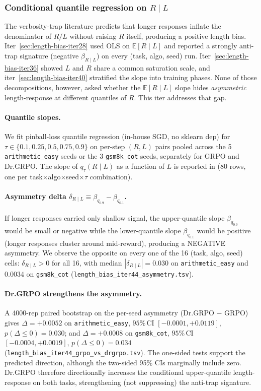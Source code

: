 \documentclass{article}
\newcommand{\E}{\mathbb{E}}
\newcommand{\task}{\textsf{task}}
\newcommand{\algo}{\textsf{algo}}
\newcommand{\seed}{\textsf{seed}}
\begin{document}
\subsubsection{Conditional quantile regression on $R \mid L$}\label{sec:lb-iter44}

The verbosity-trap literature predicts that longer responses inflate the
denominator of $R/L$ without raising $R$ itself, producing a positive length
bias. Iter~\ref{sec:length-bias-iter28} used OLS on $\E[R\mid L]$ and reported a
strongly anti-trap signature (negative $\beta_{R\mid L}$) on every
(\task, \algo, \seed) run. Iter~\ref{sec:length-bias-iter36} showed $L$ and $R$ share
a common saturation scale, and iter~\ref{sec:length-bias-iter40} stratified the slope
into training phases. None of those decompositions, however, asked whether the
$\E[R\mid L]$ slope hides \emph{asymmetric} length-response at different
quantiles of $R$. This iter addresses that gap.

\paragraph{Quantile slopes.}
We fit pinball-loss quantile regression (in-house SGD, no sklearn dep) for
$\tau \in \{0.1, 0.25, 0.5, 0.75, 0.9\}$ on per-step $(R, L)$ pairs pooled
across the 5 \texttt{arithmetic\_easy} seeds or the 3 \texttt{gsm8k\_cot}
seeds, separately for GRPO and Dr.GRPO. The slope of $q_\tau(R \mid L)$ as a
function of $L$ is reported in
 (80 rows,
one per \task$\times$\algo$\times$\seed$\times\tau$ combination).

\paragraph{Asymmetry delta $\delta_{R \mid L} \equiv \beta_{q_{0.9}} -
\beta_{q_{0.1}}$.}
If longer responses carried only shallow signal, the upper-quantile slope
$\beta_{q_{0.9}}$ would be small or negative while the lower-quantile slope
$\beta_{q_{0.1}}$ would be positive (longer responses cluster around
mid-reward), producing a NEGATIVE asymmetry. We observe the opposite on every
one of the 16 (\task, \algo, \seed) cells: $\delta_{R \mid L} > 0$ for all
16, with median $|\delta_{R \mid L}| = 0.030$ on \texttt{arithmetic\_easy}
and $0.0034$ on \texttt{gsm8k\_cot} (\texttt{length\_bias\_iter44\_asymmetry.tsv}).

\paragraph{Dr.GRPO strengthens the asymmetry.}
A 4000-rep paired bootstrap on the per-seed asymmetry (Dr.GRPO $-$ GRPO)
gives $\Delta = +0.0052$ on \texttt{arithmetic\_easy}, $95\%$\,CI
$[-0.0001, +0.0119]$, $p(\Delta \le 0) = 0.030$; and $\Delta = +0.0008$ on
\texttt{gsm8k\_cot}, $95\%$\,CI $[-0.0004, +0.0019]$, $p(\Delta \le 0) =
0.034$ (\texttt{length\_bias\_iter44\_grpo\_vs\_drgrpo.tsv}). The one-sided
tests support the predicted direction, although the two-sided 95\% CIs
marginally include zero. Dr.GRPO therefore directionally
increases the conditional upper-quantile length-response on both tasks,
strengthening (not suppressing) the anti-trap signature.
\end{document}
